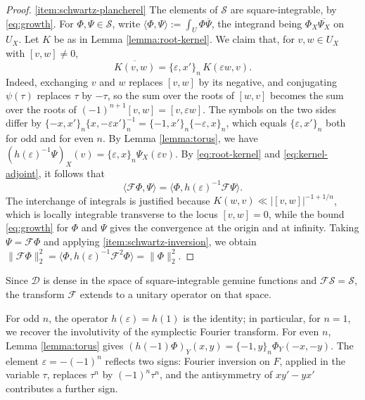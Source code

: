 \documentclass[reqno]{amsart}
\theoremstyle{plain}
\theoremstyle{definition}
\theoremstyle{itplain}
\numberwithin{equation}{section}
\numberwithin{theorem}{section}
\begin{document}
\begin{proof}
  \eqref{item:schwartz-plancherel} The elements of $\mathcal{S}$ are square-integrable, by \eqref{eq:growth}.  For $\Phi, \Psi \in \mathcal{S}$, write $\langle \Phi, \Psi \rangle := \int_U \Phi \overline{\Psi}$, the integrand being $\Phi_X \overline{\Psi_X}$ on $U_X$.  Let $K$ be as in Lemma \ref{lemma:root-kernel}.  We claim that, for $v, w \in U_X$ with $[v, w] \neq 0$,
  \begin{equation}\label{eq:kernel-adjoint}
    \overline{K(v, w)} = \{\varepsilon, x'\}_n \, K(\varepsilon w, v).
  \end{equation}
  Indeed, exchanging $v$ and $w$ replaces $[v, w]$ by its negative, and conjugating $\psi(\tau)$ replaces $\tau$ by $- \tau$, so the sum over the roots of $[w, v]$ becomes the sum over the roots of $(-1)^{n+1} [v, w] = [v, \varepsilon w]$.  The symbols on the two sides differ by $\{-x, x'\}_n \{x, - \varepsilon x'\}_n^{-1} = \{-1, x'\}_n \{- \varepsilon, x\}_n$, which equals $\{\varepsilon, x'\}_n$ both for odd and for even $n$.  By Lemma \ref{lemma:torus}, we have $(h(\varepsilon)^{-1} \Psi)_X(v) = \{\varepsilon, x\}_n \Psi_X(\varepsilon v)$.  By \eqref{eq:root-kernel} and \eqref{eq:kernel-adjoint}, it follows that
  \begin{equation*}
    \langle \mathcal{F} \Phi, \Psi \rangle = \langle \Phi, h(\varepsilon)^{-1} \mathcal{F} \Psi \rangle.
  \end{equation*}
  The interchange of integrals is justified because $K(w, v) \ll \lvert [v, w] \rvert^{-1 + 1/n}$, which is locally integrable transverse to the locus $[v, w] = 0$, while the bound \eqref{eq:growth} for $\Phi$ and $\Psi$ gives the convergence at the origin and at infinity.  Taking $\Psi = \mathcal{F} \Phi$ and applying \eqref{item:schwartz-inversion}, we obtain $\lVert \mathcal{F} \Phi \rVert_2^2 = \langle \Phi, h(\varepsilon)^{-1} \mathcal{F}^2 \Phi \rangle = \lVert \Phi \rVert_2^2$.
\end{proof}
Since $\mathcal{D}$ is dense in the space of square-integrable genuine functions and $\mathcal{F} \mathcal{S} = \mathcal{S}$, the transform $\mathcal{F}$ extends to a unitary operator on that space.

For odd $n$, the operator $h(\varepsilon) = h(1)$ is the identity; in particular, for $n = 1$, we recover the involutivity of the symplectic Fourier transform.  For even $n$, Lemma \ref{lemma:torus} gives $(h(-1) \Phi)_Y(x, y) = \{-1, y\}_n \Phi_Y(-x, -y)$.  The element $\varepsilon = - (-1)^n$ reflects two signs: Fourier inversion on $F$, applied in the variable $\tau$, replaces $\tau^n$ by $(-1)^n \tau^n$, and the antisymmetry of $x y' - y x'$ contributes a further sign.
\end{document}
